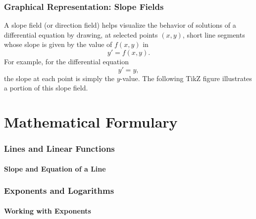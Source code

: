 \documentclass{article}
\begin{document}
\section{Graphical Representation: Slope Fields}
A slope field (or direction field) helps visualize the behavior of solutions of a differential equation by drawing, at selected points \((x,y)\), short line segments whose slope is given by the value of \(f(x,y)\) in
\[
y'=f(x,y).
\]
For example, for the differential equation
\[
y'=y,
\]
the slope at each point is simply the \(y\)-value. The following TikZ figure illustrates a portion of this slope field.

\begin{center}
\end{center}

\part{Mathematical Formulary}

\section{Lines and Linear Functions}
\subsection{Slope and Equation of a Line}

\section{Exponents and Logarithms}
\subsection{Working with Exponents}
\end{document}
